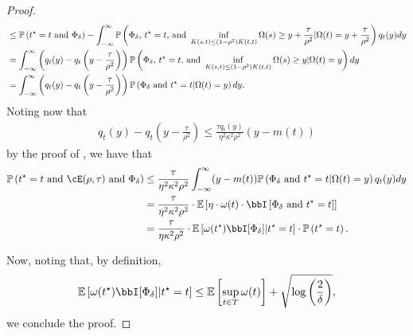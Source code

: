 \begin{proof}
\begin{align}
        &\leq \mathbb{P}\left( t^\star = t  \text{ and } \Phi_\delta \right)  - \int_{-\infty}^\infty \mathbb{P}\left( \Phi_\delta, \, t^\star=t \text{, and } \inf_{K(s,t) \leq (1- \rho^2) K(t,t)} \Omega(s) \geq y + \frac{\tau}{\rho^2} | \Omega(t) = y + \frac{\tau}{\rho^2} \right) q_t(y)d y \\
        &= \int_{-\infty}^\infty \left( q_t(y) - q_t\left( y - \frac{\tau}{\rho^2} \right) \right) \mathbb{P}\left( \Phi_\delta, \, t^\star=t \text{, and } \inf_{K(s,t) \leq (1- \rho^2) K(t,t)} \Omega(s) \geq y  | \Omega(t) = y  \right) d y \\
        &= \int_{-\infty}^\infty \left( q_t(y) - q_t\left( y - \frac{\tau}{\rho^2} \right) \right) \mathbb{P}\left( \Phi_\delta \text{ and } t^\star=t  | \Omega(t) = y  \right) d y.
    \end{align}
    Noting now that
    \begin{align}
        q_t(y) - q_t\left( y - \frac{\tau}{\rho^2} \right) \leq \frac{\tau q_t(y)}{ \eta^2 \kappa^2  \rho^2} (y - m(t))
    \end{align}
    by the proof of \citet[Theorem 5]{block2024oracle}, we have that
    \begin{align}
        \pp\left( \tstar = t \text{ and } \cE(\rho, \tau) \text{ and } \Phi_\delta \right) &\leq \frac{\tau }{ \eta^2 \kappa^2  \rho^2} \int_{-\infty}^\infty (y - m(t)) \pp\left( \Phi_\delta \text{ and } \tstar=t  | \Omega(t) = y  \right) q_t(y) d y \\
        &= \frac{\tau }{ \eta^2 \kappa^2  \rho^2} \cdot  \ee\left[ \eta  \cdot \omega(t) \cdot \bbI\left[ \Phi_\delta \text{ and } \tstar = t \right] \right] \\
        &= \frac{\tau }{ \eta \kappa^2  \rho^2} \cdot \ee\left[ \omega(\tstar) \bbI[\Phi_\delta] | \tstar = t \right] \cdot \pp\left( \tstar = t \right).
    \end{align}







    Now, noting that, by definition, 
    \begin{align}
        \ee\left[ \omega(\tstar) \bbI[\Phi_\delta] | \tstar = t \right]  \leq \ee\left[ \sup_{t \in T} \omega(t) \right] + \sqrt{\log\left( \frac 2\delta \right)},
    \end{align}
    we conclude the proof.
\end{proof}







